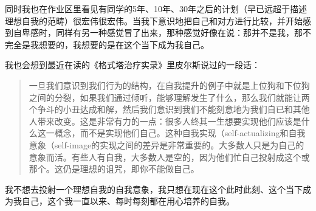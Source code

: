 同时我也在作业区里看见有同学的5年、10年、30年之后的计划（早已远超于描述理想自我的范畴）很宏伟很宏伟。当我下意识地把自己和对方进行比较，并开始感到自卑感时，同样有另一种感觉冒了出来，那种感觉好像在说：那并不是我，那不完全是我想要的，我想要的是在这个当下成为我自己。

我也会想到最近在读的《格式塔治疗实录》里皮尔斯说过的一段话：

\blockquote{一旦我们意识到我们行为的结构，在自我提升的例子中就是上位狗和下位狗之间的分裂，如果我们通过倾听，能够理解发生了什么，那么我们就能让两个争斗的小丑达成和解，然后我们意识到我们不能刻意地为我们自已和其他人带来改变。这是非常有力的一点：很多人终其一生想要实现他们应该是什么这一概念，而不是实现他们自己。这种自我实现（self-actualizing和自我意象（self-image的实现之间的差异是非常重要的。大多数人只是为自己的意象而活。有些人有自我，大多数人是空的，因为他们忙自己投射成这个或那个。这仍是理想的诅咒，即你不能做自己。}

我不想去投射一个理想自我的自我意象，我只想在现在这个此时此刻、这个当下成为我自己，这个我一直以来、每时每刻都在用心培养的自我。

